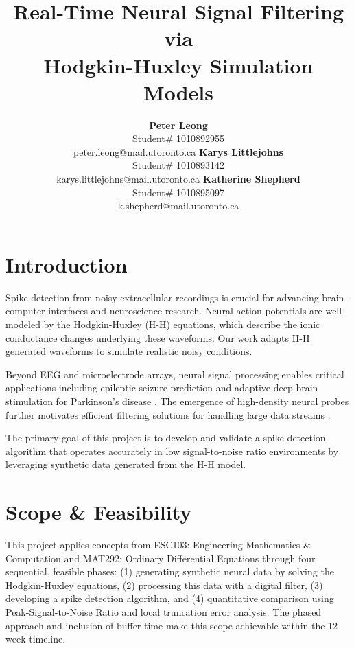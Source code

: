 \documentclass{article} %
\title{Real-Time Neural Signal Filtering via \\
Hodgkin-Huxley Simulation Models}
\author{\textbf{Peter Leong} \\
    Student\# 1010892955 \\
    peter.leong@mail.utoronto.ca
\And
    \textbf{Karys Littlejohns} \\
    Student\# 1010893142 \\
    karys.littlejohns@mail.utoronto.ca
\And
    \textbf{Katherine Shepherd} \\
    Student\# 1010895097 \\
    k.shepherd@mail.utoronto.ca
}
\begin{document}
\maketitle





\vspace{2ex}

\begin{multicols}{2}

\section{Introduction}
\label{sec:introduction}
Spike detection from noisy extracellular recordings is crucial for advancing brain-computer interfaces and neuroscience research. 
Neural action potentials are well-modeled by the Hodgkin-Huxley (H-H) equations, which describe the ionic conductance changes underlying these waveforms. 
Our work adapts H-H generated waveforms to simulate realistic noisy conditions.

Beyond EEG and microelectrode arrays, neural signal processing enables critical applications including epileptic seizure prediction \citep{addai-domfe2024epileptic} and adaptive deep brain stimulation for Parkinson's disease \citep{aljalal2022parkinson}. 
The emergence of high-density neural probes further motivates efficient filtering solutions for handling large data streams \citep{ye2024ultra}. 

The primary goal of this project is to develop and validate a spike detection algorithm that operates accurately in low signal-to-noise ratio environments by leveraging synthetic data generated from the H-H model.

\section{Scope \& Feasibility}
\label{sec:scope_feasibility}

This project applies concepts from ESC103: Engineering Mathematics \& Computation and MAT292: Ordinary Differential Equations through four sequential, feasible phases:
(1) generating synthetic neural data by solving the Hodgkin-Huxley equations,
(2) processing this data with a digital filter,
(3) developing a spike detection algorithm, and
(4) quantitative comparison using Peak-Signal-to-Noise Ratio and local truncation error analysis.
The phased approach and inclusion of buffer time make this scope achievable within the 12-week timeline.


\end{multicols}
\end{document}
